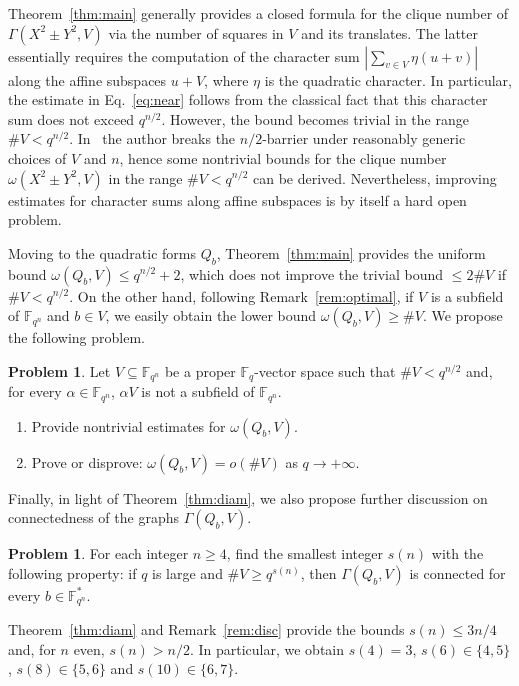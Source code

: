\documentclass[11pt]{amsart}
\newcommand{\G}{\Gamma}
\newcommand{\F}{\mathbb F}
\theoremstyle{definition}
\newtheorem{problem}[theorem]{Problem}
\theoremstyle{remark}
\begin{document}
Theorem~\ref{thm:main} generally provides a closed formula for the clique number of $\Gamma(X^2\pm Y^2, V)$ via the number of squares in $V$ and its translates. The latter essentially requires the computation of the character sum $\left|\sum_{v\in V}\eta(u+v)\right|$ along the affine subspaces $u+V$, where $\eta$ is the quadratic character. In particular, the estimate in Eq.~\eqref{eq:near} follows from the classical fact that this character sum does not exceed $q^{n/2}$. However, the bound becomes trivial in the range $\# V<q^{n/2}$. In~\cite{reis1} the author breaks the $n/2$-barrier under reasonably generic choices of $V$ and $n$, hence some nontrivial bounds for the clique number $\omega(X^2\pm Y^2, V)$ in the range $\# V<q^{n/2}$ can be derived. Nevertheless, improving estimates for character sums along affine subspaces is by itself a hard open problem.

Moving to the quadratic forms $Q_b$, Theorem~\ref{thm:main} provides the uniform bound $\omega(Q_b, V)\le q^{n/2}+2$, which does not improve the trivial bound $\le 2\# V$ if $\# V<q^{n/2}$. On the other hand, following Remark~\ref{rem:optimal}, if $V$ is a subfield of $\F_{q^n}$ and $b\in V$, we easily obtain the lower bound $\omega(Q_b, V)\ge \# V$. We propose the following problem.

\begin{problem}
Let $V\subseteq \F_{q^n}$ be a proper $\F_q$-vector space such that $\# V<q^{n/2}$ and, for every $\alpha\in \F_{q^n}$,  $\alpha V$ is not a subfield of $\F_{q^n}$.
\begin{enumerate}
    \item Provide nontrivial estimates for $\omega(Q_b, V)$.
    \item Prove or disprove: $\omega(Q_b, V)=o(\# V)$ as $q\to +\infty$.
\end{enumerate}
\end{problem}
Finally, in light of Theorem~\ref{thm:diam}, we also propose further discussion on connectedness of the graphs $\G(Q_b, V)$.

\begin{problem}
For each integer $n\ge 4$, find the smallest integer $s(n)$ with the following property: if $q$ is large and $\# V\ge q^{s(n)}$, then $\Gamma(Q_b, V)$ is connected for every $b\in \F_{q^n}^*$.
\end{problem}

Theorem~\ref{thm:diam} and Remark~\ref{rem:disc} provide the bounds $s(n)\le 3n/4$ and, for $n$ even, $s(n)>n/2$. In particular, we obtain $s(4)=3$, $s(6)\in \{4, 5\}$, $s(8)\in \{5, 6\}$ and $s(10)\in \{6, 7\}$. 
\end{document}
